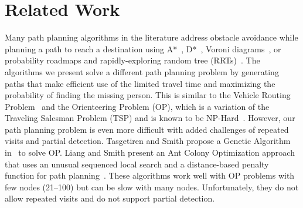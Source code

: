 \documentclass[journal]{IEEEtran}
\begin{document}
\section{Related Work}
\label{sec:RelatedWork}

Many path planning algorithms in the literature address obstacle avoidance while planning a path to reach a destination using A*~\cite{Quigley2005Toward}, D*~\cite{stentz1997optimal}, Voroni diagrams~\cite{bortoff2000path}, or probability roadmaps and rapidly-exploring random tree (RRTs)~\cite{pettersson2006probabilistic}. The algorithms we present solve a different path planning problem by generating paths that make efficient use of the limited travel time and maximizing the probability of finding the missing person. This is similar to the Vehicle Routing Problem~\cite{laporte1992vehicle} and the Orienteering Problem (OP), which is a variation of the Traveling Salesman Problem (TSP) and is known to be NP-Hard~\cite{Sokkappa1990Cost}. However, our path planning problem is even more difficult with added challenges of repeated visits and partial detection. 
Tasgetiren and Smith propose a Genetic Algorithm in~\cite{Tasgetiren2000GA} to solve OP. Liang and Smith present an Ant Colony Optimization approach that uses an unusual sequenced local search and a distance-based penalty function for path planning~\cite{Liang2006AntOrienteering}. These algorithms work well with OP problems with few nodes (21--100) but can be slow with many nodes. Unfortunately, they do not allow repeated visits and do not support partial detection.
\end{document}
